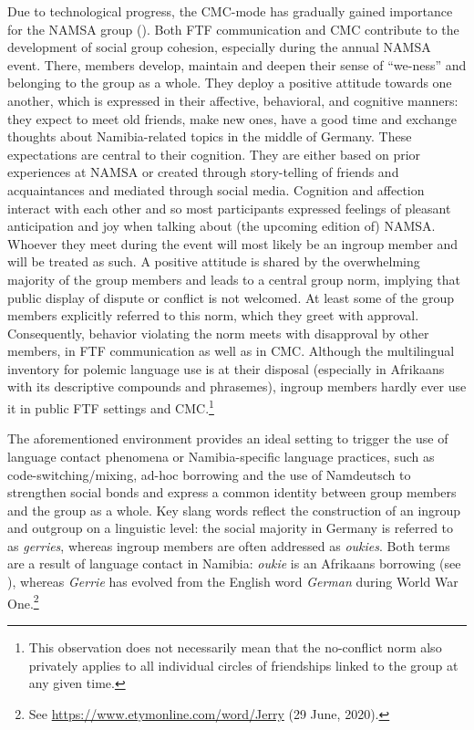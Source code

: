 \documentclass[output=paper]{langsci/langscibook}
\begin{document}
Due to technological progress, the CMC-mode has gradually gained importance for the NAMSA group (\citealt{radke_urban_inpress}). Both FTF communication and CMC contribute to the development of social group cohesion, especially during the annual NAMSA event. There, members develop, maintain and deepen their sense of “we-ness” and belonging to the group as a whole. They deploy a positive attitude towards one another, which is expressed in their affective, behavioral, and cognitive manners: they expect to meet old friends, make new ones, have a good time and exchange thoughts about Namibia-related topics in the middle of Germany. These expectations are central to their cognition. They are either based on prior experiences at NAMSA or created through story-telling of friends and acquaintances and mediated through social media. Cognition and affection interact with each other and so most participants expressed feelings of pleasant anticipation and joy when talking about (the upcoming edition of) NAMSA. Whoever they meet during the event will most likely be an ingroup member and will be treated as such. A positive attitude is shared by the overwhelming majority of the group members and leads to a central group norm, implying that public display of dispute or conflict is not welcomed. At least some of the group members explicitly referred to this norm, which they greet with approval. Consequently, behavior violating the norm meets with disapproval by other members, in FTF communication as well as in CMC. Although the multilingual inventory for polemic language use is at their disposal (especially in Afrikaans with its descriptive compounds and phrasemes), ingroup members hardly ever use it in public FTF settings and CMC.\footnote{This observation does not necessarily mean that the no-conflict norm also privately applies to all individual circles of friendships linked to the group at any given time.}

The aforementioned environment provides an ideal setting to trigger the use of language contact phenomena or Namibia-specific language practices, such as code-switching/mixing, ad-hoc borrowing and the use of Namdeutsch to streng\-then social bonds and express a common identity between group members and the group as a whole. Key slang words reflect the construction of an ingroup and outgroup on a linguistic level: the social majority in Germany is referred to as \textit{gerries}, whereas ingroup members are often addressed as \textit{oukies}. Both terms are a result of language contact in Namibia: \textit{oukie} is an Afrikaans borrowing (see ), whereas \textit{Gerrie} has evolved from the English word \textit{German} during World War One.\footnote{See \url{https://www.etymonline.com/word/Jerry} {(}29 June, 2020{)}.}
\end{document}
